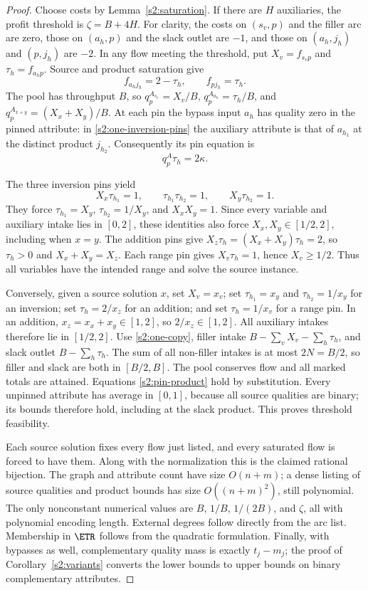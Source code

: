 \begin{proof}
Choose costs by Lemma~\ref{s2:saturation}. If there are $H$ auxiliaries,
the profit threshold is $\zeta=B+4H$. For clarity, the costs on
$(s_v,p)$ and the filler arc are zero, those on $(a_h,p)$ and the
slack outlet are $-1$, and those on $(a_h,j_h)$ and $(p,j_h)$ are $-2$.
In any flow meeting the threshold, put $X_v=f_{s_vp}$ and
$\tau_h=f_{a_hp}$. Source and product saturation give
\begin{equation}
 f_{a_hj_h}=2-\tau_h,\qquad f_{pj_h}=\tau_h.\label{s2:one-copy}
\end{equation}
The pool has throughput $B$, so
$q_p^{A_{s_v}}=X_v/B$, $q_p^{A_{a_h}}=\tau_h/B$, and
$q_p^{A_{x+y}}=(X_x+X_y)/B$. At each pin the bypass input $a_h$
has quality zero in the pinned attribute: in
\eqref{s2:one-inversion-pins} the auxiliary attribute is that of
$a_{h_1}$ at the distinct product $j_{h_2}$. Consequently its pin
equation is
\begin{equation}
 q_p^A\tau_h=2\kappa.\label{s2:pin-product}
\end{equation}

The three inversion pins yield
\[
 X_x\tau_{h_1}=1,\qquad
 \tau_{h_1}\tau_{h_2}=1,\qquad X_y\tau_{h_2}=1.
\]
They force $\tau_{h_1}=X_y$, $\tau_{h_2}=1/X_y$, and $X_xX_y=1$.
Since every variable and auxiliary intake lies in $[0,2]$, these
identities also force $X_x,X_y\in[1/2,2]$, including when $x=y$.
The addition pins give
$X_z\tau_h=(X_x+X_y)\tau_h=2$, so $\tau_h>0$ and
$X_x+X_y=X_z$. Each range pin gives $X_v\tau_h=1$, hence
$X_v\ge1/2$. Thus all variables have the intended range and solve
the source instance.

Conversely, given a source solution $x$, set $X_v=x_v$; set
$\tau_{h_1}=x_y$ and $\tau_{h_2}=1/x_y$ for an inversion;
set $\tau_h=2/x_z$ for an addition; and set $\tau_h=1/x_v$ for
a range pin. In an addition, $x_z=x_x+x_y\in[1,2]$, so
$2/x_z\in[1,2]$. All auxiliary intakes therefore lie in $[1/2,2]$.
Use \eqref{s2:one-copy}, filler intake
$B-\sum_vX_v-\sum_h\tau_h$, and slack outlet
$B-\sum_h\tau_h$. The sum of all non-filler intakes is at most
$2N=B/2$, so filler and slack are both in $[B/2,B]$.
The pool conserves flow and all marked totals are attained.
Equations \eqref{s2:pin-product} hold by substitution. Every unpinned
attribute has average in $[0,1]$, because all source qualities are
binary; its bounds therefore hold, including at the slack product.
This proves threshold feasibility.

Each source solution fixes every flow just listed, and every saturated
flow is forced to have them. Along with the normalization this is the
claimed rational bijection. The graph and attribute count have size
$O(n+m)$; a dense listing of source qualities and product bounds has
size $O((n+m)^2)$, still polynomial. The only nonconstant numerical
values are $B$, $1/B$, $1/(2B)$, and $\zeta$, all with polynomial
encoding length. External degrees follow directly from the arc list.
Membership in $\ETR$ follows from the quadratic formulation. Finally,
with bypasses as well, complementary quality mass is exactly $t_j-m_j$;
the proof of Corollary~\ref{s2:variants} converts the lower bounds to
upper bounds on binary complementary attributes.
\end{proof}

